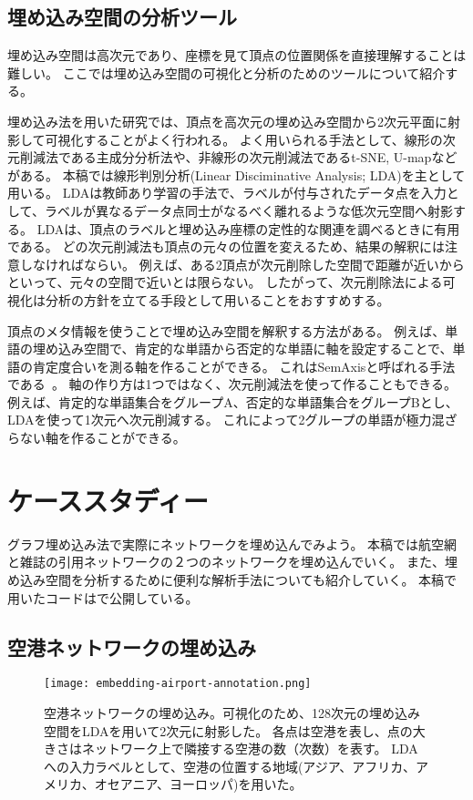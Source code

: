 \documentclass[J]{scitrans}
\begin{document}
\subsection{埋め込み空間の分析ツール}

埋め込み空間は高次元であり、座標を見て頂点の位置関係を直接理解することは難しい。
ここでは埋め込み空間の可視化と分析のためのツールについて紹介する。

埋め込み法を用いた研究では、頂点を高次元の埋め込み空間から2次元平面に射影して可視化することがよく行われる。
よく用いられる手法として、線形の次元削減法である主成分分析法や、非線形の次元削減法であるt-SNE\cite{Maaten2008}, U-map\cite{McInnes2018}などがある。
本稿では線形判別分析(Linear Disciminative Analysis; LDA)を主として用いる。
LDAは教師あり学習の手法で、ラベルが付与されたデータ点を入力として、ラベルが異なるデータ点同士がなるべく離れるような低次元空間へ射影する。
LDAは、頂点のラベルと埋め込み座標の定性的な関連を調べるときに有用である。
どの次元削減法も頂点の元々の位置を変えるため、結果の解釈には注意しなければならい。
例えば、ある2頂点が次元削除した空間で距離が近いからといって、元々の空間で近いとは限らない。
したがって、次元削除法による可視化は分析の方針を立てる手段として用いることをおすすめする。

頂点のメタ情報を使うことで埋め込み空間を解釈する方法がある。
例えば、単語の埋め込み空間で、肯定的な単語から否定的な単語に軸を設定することで、単語の肯定度合いを測る軸を作ることができる。
これはSemAxisと呼ばれる手法である~\cite{An2018}。
軸の作り方は1つではなく、次元削減法を使って作ることもできる。
例えば、肯定的な単語集合をグループA、否定的な単語集合をグループBとし、LDAを使って1次元へ次元削減する。
これによって2グループの単語が極力混ざらない軸を作ることができる。

\section{ケーススタディー}

グラフ埋め込み法で実際にネットワークを埋め込んでみよう。
本稿では航空網と雑誌の引用ネットワークの２つのネットワークを埋め込んでいく。
また、埋め込み空間を分析するために便利な解析手法についても紹介していく。
本稿で用いたコードは\cite{}で公開している。

\subsection{空港ネットワークの埋め込み}

\begin{figure}
    \centering
    \texttt{[image: embedding-airport-annotation.png]}
    \caption{
        空港ネットワークの埋め込み。可視化のため、128次元の埋め込み空間をLDAを用いて2次元に射影した。
        各点は空港を表し、点の大きさはネットワーク上で隣接する空港の数（次数）を表す。
        LDAへの入力ラベルとして、空港の位置する地域(アジア、アフリカ、アメリカ、オセアニア、ヨーロッパ)を用いた。
    }
    \label{fig:airport}
\end{figure}
\end{document}
